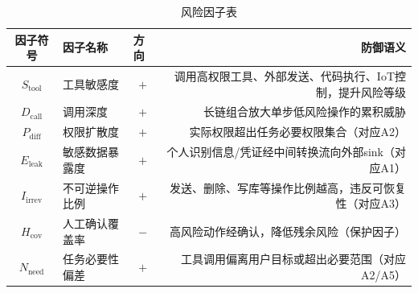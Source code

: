 \begin{table}[htbp]
\centering
\caption{风险因子表}
\label{tab:risk_factors}
\small
\begin{tabularx}{\textwidth}{clcr}
\toprule
\textbf{因子符号} & \textbf{因子名称} & \multicolumn{1}{l}{\textbf{方向}} & \textbf{防御语义} \\
\midrule
$S_{\text{tool}}$ & 工具敏感度 & $+$ & 调用高权限工具、外部发送、代码执行、IoT控制，提升风险等级 \\
$D_{\text{call}}$ & 调用深度 & $+$ & 长链组合放大单步低风险操作的累积威胁 \\
$P_{\text{diff}}$ & 权限扩散度 & $+$ & 实际权限超出任务必要权限集合（对应A2） \\
$E_{\text{leak}}$ & 敏感数据暴露度 & $+$ & 个人识别信息/凭证经中间转换流向外部sink（对应A1） \\
$I_{\text{irrev}}$ & 不可逆操作比例 & $+$ & 发送、删除、写库等操作比例越高，违反可恢复性（对应A3） \\
$H_{\text{cov}}$ & 人工确认覆盖率 & $-$ & 高风险动作经确认，降低残余风险（保护因子） \\
$N_{\text{need}}$ & 任务必要性偏差 & $+$ & 工具调用偏离用户目标或超出必要范围（对应A2/A5） \\
\bottomrule
\end{tabularx}
\end{table}
